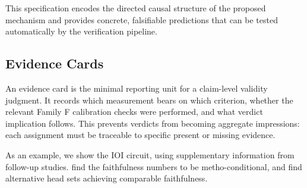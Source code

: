 \documentclass[10pt]{article}
\begin{document}
This specification encodes the directed causal structure of the proposed mechanism and provides concrete, falsifiable predictions that can be tested automatically by the verification pipeline.

\subsection{Evidence Cards}

\label{appendix:evidence-cards}


An evidence card is the minimal reporting unit for a claim-level validity judgment.
It records which measurement bears on which criterion, whether the relevant
Family F calibration checks were performed, and what verdict implication follows.
This prevents verdicts from becoming aggregate impressions: each assignment must
be traceable to specific present or missing evidence.

As an example, we show the IOI circuit, using supplementary information from follow-up studies.
\citep{miller2024transformer} find the faithfulness numbers to be metho-conditional, and \citep{meloux2025everything} find alternative head sets achieving comparable faithfulness.
\end{document}
